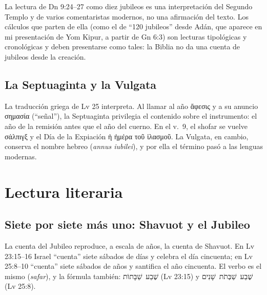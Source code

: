 \documentclass[11pt,letterpaper]{article}
\newcommand{\heb}[1]{\mbox{\foreignlanguage{hebrew}{#1}}}
\newcommand{\grc}[1]{\foreignlanguage{ancientgreek}{#1}}
\begin{document}
\begin{nota}[Precisión]
La lectura de Dn 9:24--27 como diez jubileos es una interpretación del Segundo Templo y de varios comentaristas modernos, no una afirmación del texto. Los cálculos que parten de ella (como el de ``120 jubileos'' desde Adán, que aparece en mi presentación de Yom Kipur, a partir de Gn 6:3) son lecturas tipológicas y cronológicas y deben presentarse como tales: la Biblia no da una cuenta de jubileos desde la creación.
\end{nota}

\subsection{La Septuaginta y la Vulgata}
La traducción griega de Lv 25 interpreta. Al llamar al año \grc{ἄφεσις} y a su anuncio \grc{σημασία} (``señal''), la Septuaginta privilegia el contenido sobre el instrumento: el año de la remisión antes que el año del cuerno. En el v.~9, el shofar se vuelve \grc{σάλπιγξ} y el Día de la Expiación \grc{ἡ ἡμέρα τοῦ ἱλασμοῦ}. La Vulgata, en cambio, conserva el nombre hebreo (\emph{annus iubilei}), y por ella el término pasó a las lenguas modernas.

\section{Lectura literaria}

\subsection{Siete por siete más uno: Shavuot y el Jubileo}
La cuenta del Jubileo reproduce, a escala de años, la cuenta de Shavuot. En Lv 23:15--16 Israel ``cuenta'' siete sábados de días y celebra el día cincuenta; en Lv 25:8--10 ``cuenta'' siete sábados de años y santifica el año cincuenta. El verbo es el mismo (\emph{safar}), y la fórmula también: \heb{שֶׁבַע שַׁבָּתוֹת} (Lv 23:15) y \heb{שֶׁבַע שַׁבְּתֹת שָׁנִים} (Lv 25:8).
\end{document}
